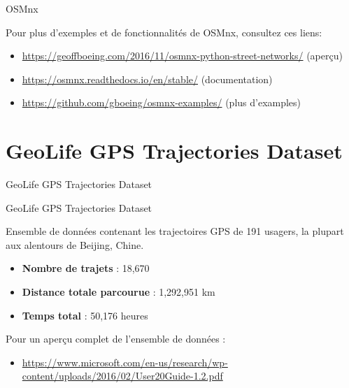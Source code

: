 \documentclass[aspectratio=169]{beamer}
\begin{document}
\begin{frame}{OSMnx \cite{boeing2017osmnx}}

{\Large Pour plus d'exemples et de fonctionnalités de OSMnx, consultez ces liens:}
\vspace{1cm}
\begin{itemize}
	\item \url{https://geoffboeing.com/2016/11/osmnx-python-street-networks/} (aperçu)
	\item \url{https://osmnx.readthedocs.io/en/stable/} (documentation)
	\item \url{https://github.com/gboeing/osmnx-examples/} (plus d'examples)
\end{itemize}

\end{frame}


\section{GeoLife GPS Trajectories Dataset}

\begin{frame}{GeoLife GPS Trajectories Dataset \cite{zheng2008understanding, zheng2010geolife, zheng2009mining}}

\begin{center}
{\LARGE GeoLife GPS Trajectories Dataset}
\end{center}

Ensemble de données contenant les trajectoires GPS de 191 usagers, la plupart aux alentours de Beijing, Chine.
\begin{itemize}
	\item \textbf{Nombre de trajets} : 18,670
	\item \textbf{Distance totale parcourue} : 1,292,951 km
	\item \textbf{Temps total} : 50,176 heures
\end{itemize}
\vspace{.5cm}
Pour un aperçu complet de l'ensemble de données :
\begin{itemize}
	\item \url{https://www.microsoft.com/en-us/research/wp-content/uploads/2016/02/User20Guide-1.2.pdf}
\end{itemize}

\end{frame}
\end{document}
